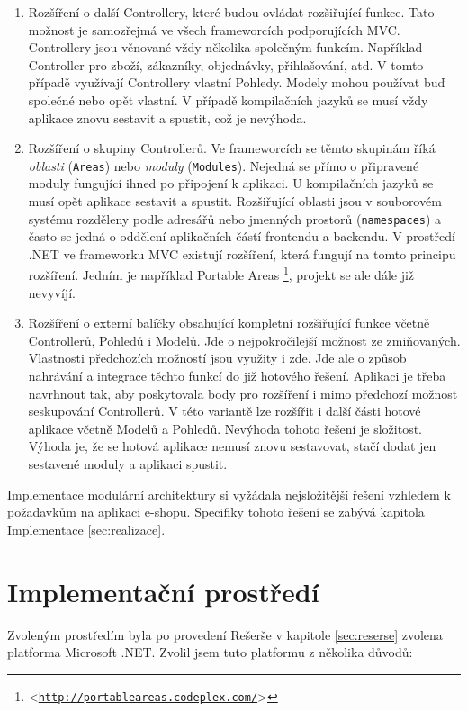 \documentclass[11pt,twoside,a4paper]{book}
\let\oldUrl\url
\renewcommand\url[1]{<\texttt{\oldUrl{#1}}>}
\begin{document}
\begin{enumerate}
\item Rozšíření o další Controllery, které budou ovládat rozšiřující funkce. Tato možnost je samozřejmá ve všech frameworcích podporujících MVC. Controllery jsou věnované vždy několika společným funkcím. Například Controller pro zboží, zákazníky, objednávky, přihlašování, atd. V tomto případě využívají Controllery vlastní Pohledy. Modely mohou používat buď společné nebo opět vlastní. V případě kompilačních jazyků se musí vždy aplikace znovu sestavit a spustit, což je nevýhoda.

\item Rozšíření o skupiny Controllerů. Ve frameworcích se těmto skupinám říká \textit{oblasti} (\texttt{Areas}) nebo \textit{moduly} (\texttt{Modules}). Nejedná se přímo o připravené moduly fungující ihned po připojení k aplikaci. U kompilačních jazyků se musí opět aplikace sestavit a spustit. Rozšiřující oblasti jsou v souborovém systému rozděleny podle adresářů nebo jmenných prostorů (\texttt{namespaces}) a často se jedná o oddělení aplikačních částí frontendu a backendu. V prostředí .NET ve frameworku MVC existují rozšíření, která fungují na tomto principu rozšíření. Jedním je například Portable Areas \footnote{\url{http://portableareas.codeplex.com/}}, projekt se ale dále již nevyvíjí.

\item Rozšíření o externí balíčky obsahující kompletní rozšiřující funkce včetně Controllerů, Pohledů i Modelů. Jde o nejpokročilejší možnost ze zmiňovaných. Vlastnosti předchozích možností jsou využity i zde. Jde ale o způsob nahrávání a integrace těchto funkcí do již hotového řešení. Aplikaci je třeba navrhnout tak, aby poskytovala body pro rozšíření i mimo předchozí možnost seskupování Controllerů. V této variantě lze rozšířit i další části hotové aplikace včetně Modelů a Pohledů. Nevýhoda tohoto řešení je složitost. Výhoda je, že se hotová aplikace nemusí znovu sestavovat, stačí dodat jen sestavené moduly a aplikaci spustit.
\end{enumerate}


Implementace modulární architektury si vyžádala nejsložitější řešení vzhledem k požadavkům na aplikaci e-shopu. Specifiky tohoto řešení se zabývá kapitola Implementace \ref{sec:realizace}.


\section{Implementační prostředí}
\label{implprost}
Zvoleným prostředím byla po provedení  Rešerše v kapitole \ref{sec:reserse} zvolena platforma Microsoft .NET. Zvolil jsem tuto platformu z několika důvodů:
\end{document}
